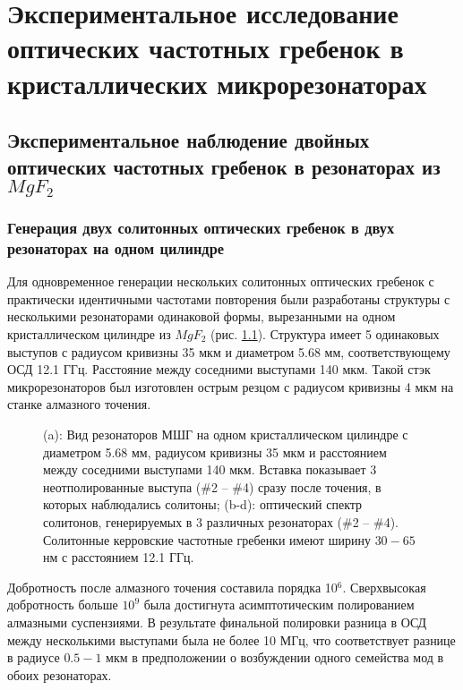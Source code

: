 \chapter{Экспериментальное исследование оптических частотных гребенок в кристаллических микрорезонаторах} \label{chapt4}

\section{Экспериментальное наблюдение двойных оптических частотных гребенок в резонаторах из $MgF_2$}

\subsection{Генерация двух солитонных оптических гребенок в двух резонаторах на одном цилиндре}

Для одновременное генерации нескольких солитонных оптических гребенок \cite{Pavlov2017} с практически идентичными частотами повторения были разработаны структуры с несколькими резонаторами одинаковой формы, вырезанными на одном кристаллическом цилиндре из $MgF_2$ (рис. \ref{ris:image1}). Структура имеет 5 одинаковых выступов с радиусом кривизны 35 мкм и диаметром 5.68 мм, соответствующему ОСД 12.1 ГГц. Расстояние между соседними выступами 140 мкм. Такой стэк микрорезонаторов был изготовлен острым резцом с радиусом кривизны 4 мкм на станке алмазного точения.

\begin{figure}[ht]
\begin{minipage}[ht]{1\linewidth}
\end{minipage}
\caption{ (a): Вид резонаторов МШГ на одном кристаллическом цилиндре с диаметром 5.68 мм, радиусом кривизны 35 мкм и расстоянием между соседними выступами 140 мкм. Вставка показывает 3 неотполированные выступа (\#2 -- \#4) сразу после точения, в которых наблюдались солитоны; (b-d): оптический спектр солитонов, генерируемых в 3 различных резонаторах (\#2 -- \#4). Солитонные керровские частотные гребенки имеют ширину $30 - 65$ нм с расстоянием 12.1 ГГц.}
\label{ris:image1}
\end{figure}

Добротность после алмазного точения составила порядка 10$^6$. Сверхвысокая добротность больше $10^9$ была достигнута асимптотическим полированием алмазными суспензиями. В результате финальной полировки разница в ОСД между несколькими выступами была не более 10 МГц, что соответствует разнице в радиусе $0.5 - 1$ мкм в предположении о возбуждении одного семейства мод в обоих резонаторах.

